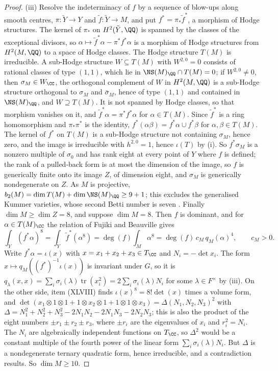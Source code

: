 \begin{proof}
(iii) Resolve the indeterminacy of $f$ by a sequence of blow-ups along
smooth centres, $\pi\colon\tilde{Y}\to Y$ and $\tilde{f}\colon\tilde{Y}\to M$,
and put $f^{*}=\pi_{*}\tilde{f}^{*}$, a morphism of Hodge structures. The
kernel of $\pi_{*}$ on $H^{2}(\tilde{Y},\QQ)$ is spanned by the classes of
the exceptional divisors, so $\alpha\mapsto\tilde{f}^{*}\alpha-
\pi^{*}f^{*}\alpha$ is a morphism of Hodge structures from $H^{2}(M,\QQ)$ to a
space of Hodge classes. The Hodge structure $T(M)$ is irreducible. A
sub-Hodge structure $W\subseteq T(M)$ with $W^{2,0}=0$ consists of rational
classes of type $(1,1)$, which lie in $\NS(M)_{\QQ}\cap T(M)=0$; if
$W^{2,0}\ne0$, then $\sigma_{M}\in W_{\CC}$, the orthogonal complement of $W$
in $H^{2}(M,\QQ)$ is a sub-Hodge structure orthogonal to $\sigma_{M}$ and
$\bar{\sigma}_{M}$, hence of type $(1,1)$ and contained in $\NS(M)_{\QQ}$,
and $W\supseteq T(M)$. It is not spanned by Hodge classes, so that
morphism vanishes on it, and $\tilde{f}^{*}\alpha=\pi^{*}f^{*}\alpha$ for
$\alpha\in T(M)$. Since $\tilde{f}^{*}$ is a ring homomorphism and
$\pi_{*}\pi^{*}$ is the identity, $f^{*}(\alpha\beta)=f^{*}\alpha\cup
f^{*}\beta$ for $\alpha,\beta\in T(M)$. The kernel of $f^{*}$ on $T(M)$ is a
sub-Hodge structure not containing $\sigma_{M}$, hence zero, and the image is
irreducible with $h^{2,0}=1$, hence $\iota(T)$ by (i). So $f^{*}\sigma_{M}$ is
a nonzero multiple of $\sigma_{0}$ and has rank eight at every point of $Y$
where $f$ is defined; the rank of a pulled-back form is at most the dimension
of the image, so $f$ is generically finite onto its image $Z$, of dimension
eight, and $\sigma_{M}$ is generically nondegenerate on $Z$. As $M$ is
projective, $b_{2}(M)=\dim T(M)+\dim\NS(M)_{\QQ}\ge9+1$; this excludes the
generalised Kummer varieties, whose second Betti number is seven
\cite{Bea83}. Finally $\dim M\ge\dim Z=8$, and suppose $\dim M=8$. Then $f$
is dominant, and for $\alpha\in T(M)_{\CC}$ the relation of Fujiki and
Beauville \cite{Bea83,Fuj87} gives
\[
  \int_{Y}(f^{*}\alpha)^{8}=\int_{\tilde{Y}}\tilde{f}^{*}(\alpha^{8})
  =\deg(f)\int_{M}\alpha^{8}=\deg(f)\,c_{M}\,q_{M}(\alpha)^{4},
  \qquad c_{M}>0 .
\]
Write $f^{*}\alpha=\iota(x)$ with $x=x_{1}+x_{2}+x_{3}\in T_{\CC}$ and
$N_{i}=-\det x_{i}$. The form $x\mapsto q_{M}((f^{*})^{-1}\iota(x))$ is
invariant under $G$, so it is $q_{\lambda}(x,x)=
\sum_{i}\sigma_{i}(\lambda)\operatorname{tr}(x_{i}^{2})=
2\sum_{i}\sigma_{i}(\lambda)N_{i}$ for some $\lambda\in F^{\times}$ by
(iii). On the other side, item (XLVIII) finds
$\iota(x)^{8}=8!\det(x)$ times a volume form, and
$\det(x_{1}\otimes1\otimes1+1\otimes x_{2}\otimes1+1\otimes1\otimes
x_{3})=\Delta(N_{1},N_{2},N_{3})^{2}$ with
$\Delta=N_{1}^{2}+N_{2}^{2}+N_{3}^{2}-2N_{1}N_{2}-2N_{1}N_{3}-2N_{2}N_{3}$;
this is also the product of the eight numbers $\pm r_{1}\pm r_{2}\pm r_{3}$,
where $\pm r_{i}$ are the eigenvalues of $x_{i}$ and $r_{i}^{2}=N_{i}$. The
$N_{i}$ are algebraically independent functions on $T_{\CC}$, so
$\Delta^{2}$ would be a constant multiple of the fourth power of the linear
form $\sum_{i}\sigma_{i}(\lambda)N_{i}$. But $\Delta$ is a nondegenerate
ternary quadratic form, hence irreducible, and a contradiction results. So
$\dim M\ge10$.


\end{proof}
